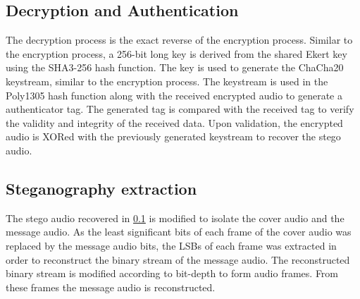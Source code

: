 \documentclass[a4paper]{cas-sc}
\begin{document}
\subsection{Decryption and Authentication}
\label{sec:chacha20poly1305decryption}
The decryption process is the exact reverse of the encryption process. Similar to the encryption process, a 256-bit long key is derived from the shared Ekert key using the SHA3-256 hash function. The key is used to generate the ChaCha20 keystream, similar to the encryption process. The keystream is used in the Poly1305 hash function along with the received encrypted audio to generate a authenticator tag. The generated tag is compared with the received tag to verify the validity and integrity of the received data. Upon validation, the encrypted audio is XORed with the previously generated keystream to recover the stego audio.
\subsection{Steganography extraction}
\label{sec:stegoExtract}
The stego audio recovered in \ref{sec:chacha20poly1305decryption} is modified to isolate the cover audio and the message audio. As the least significant bits of each frame of the cover audio was replaced by the message audio bits, the LSBs of each frame was extracted in order to reconstruct the binary stream of the message audio. The reconstructed binary stream is modified according to bit-depth to form audio frames. From these frames the message audio is reconstructed.
\newpage
\end{document}
